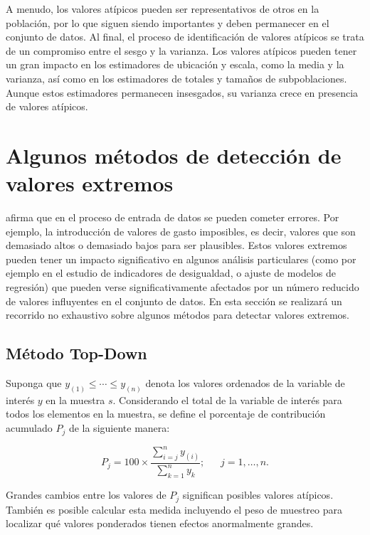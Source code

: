 \documentclass[
  12pt,
]{book}
\begin{document}
A menudo, los valores atípicos pueden ser representativos de otros en la población, por lo que siguen siendo importantes y deben permanecer en el conjunto de datos. Al final, el proceso de identificación de valores atípicos se trata de un compromiso entre el sesgo y la varianza. Los valores atípicos pueden tener un gran impacto en los estimadores de ubicación y escala, como la media y la varianza, así como en los estimadores de totales y tamaños de subpoblaciones. Aunque estos estimadores permanecen insesgados, su varianza crece en presencia de valores atípicos.

\hypertarget{algunos-muxe9todos-de-detecciuxf3n-de-valores-extremos}{%
\section{Algunos métodos de detección de valores extremos}\label{algunos-muxe9todos-de-detecciuxf3n-de-valores-extremos}}

\citet{Filzmoser_Gussenbauer_Templ_2016} afirma que en el proceso de entrada de datos se pueden cometer errores. Por ejemplo, la introducción de valores de gasto imposibles, es decir, valores que son demasiado altos o demasiado bajos para ser plausibles. Estos valores extremos pueden tener un impacto significativo en algunos análisis particulares (como por ejemplo en el estudio de indicadores de desigualdad, o ajuste de modelos de regresión) que pueden verse significativamente afectados por un número reducido de valores influyentes en el conjunto de datos. En esta sección se realizará un recorrido no exhaustivo sobre algunos métodos para detectar valores extremos.

\hypertarget{muxe9todo-top-down}{%
\subsection{Método Top-Down}\label{muxe9todo-top-down}}

Suponga que \(y_{(1)}\le\cdots\le y_{(n)}\) denota los valores ordenados de la variable de interés \(y\) en la muestra \(s\). Considerando el total de la variable de interés para todos los elementos en la muestra, se define el porcentaje de contribución acumulado \(P_j\) de la siguiente manera:

\[
P_j=100\times\frac{\sum_{i=j}^n y_{(i)}}{\sum_{k=1}^n y_k}; \ \ \ \ \ \ \ j = 1, \ldots, n.
\]

Grandes cambios entre los valores de \(P_j\) significan posibles valores atípicos. También es posible calcular esta medida incluyendo el peso de muestreo para localizar qué valores ponderados tienen efectos anormalmente grandes.
\end{document}
